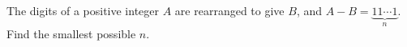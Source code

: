 The digits of a positive integer $A$ are rearranged to give $B$, and $A-B=\underbrace{11\cdots1}_{n}$. Find the smallest possible $n$.
